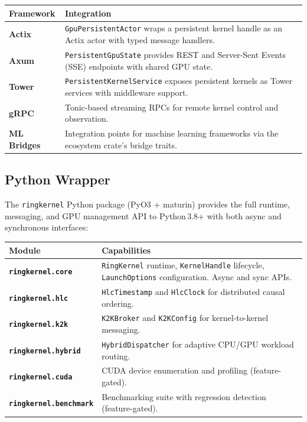 \documentclass[11pt,a4paper]{article}
\begin{document}
\begin{table}[h!]
\centering
\renewcommand{\arraystretch}{1.2}
\begin{tabularx}{\textwidth}{>{\bfseries\color{brand}}l X}
\toprule
\textbf{Framework} & \textbf{Integration} \\
\midrule
Actix &
  \texttt{GpuPersistentActor} wraps a persistent kernel handle as an Actix
  actor with typed message handlers. \\
Axum &
  \texttt{PersistentGpuState} provides REST and Server-Sent Events (SSE)
  endpoints with shared GPU state. \\
Tower &
  \texttt{PersistentKernelService} exposes persistent kernels as Tower
  services with middleware support. \\
gRPC &
  Tonic-based streaming RPCs for remote kernel control and observation. \\
ML Bridges &
  Integration points for machine learning frameworks via the ecosystem
  crate's bridge traits. \\
\bottomrule
\end{tabularx}
\end{table}

\subsection{Python Wrapper}

The \texttt{ringkernel} Python package (PyO3 + maturin) provides the full
runtime, messaging, and GPU management API to Python\,3.8+ with both async
and synchronous interfaces:

\begin{table}[h!]
\centering
\renewcommand{\arraystretch}{1.2}
\begin{tabularx}{\textwidth}{>{\bfseries\color{brand}}l X}
\toprule
\textbf{Module} & \textbf{Capabilities} \\
\midrule
\texttt{ringkernel.core} &
  \texttt{RingKernel} runtime, \texttt{KernelHandle} lifecycle,
  \texttt{LaunchOptions} configuration. Async and sync APIs. \\
\texttt{ringkernel.hlc} &
  \texttt{HlcTimestamp} and \texttt{HlcClock} for distributed causal ordering. \\
\texttt{ringkernel.k2k} &
  \texttt{K2KBroker} and \texttt{K2KConfig} for kernel-to-kernel messaging. \\
\texttt{ringkernel.hybrid} &
  \texttt{HybridDispatcher} for adaptive CPU/GPU workload routing. \\
\texttt{ringkernel.cuda} &
  CUDA device enumeration and profiling (feature-gated). \\
\texttt{ringkernel.benchmark} &
  Benchmarking suite with regression detection (feature-gated). \\
\bottomrule
\end{tabularx}
\end{table}
\end{document}
